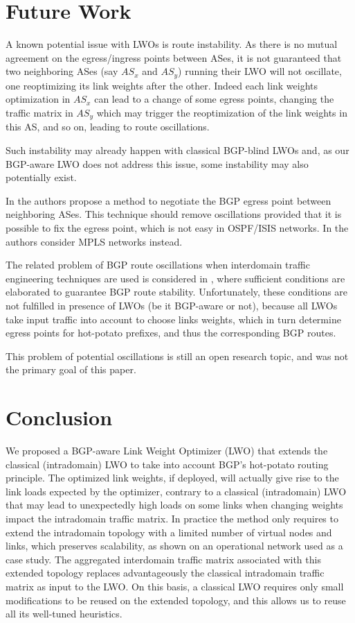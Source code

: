 \documentclass{acm_proc_article-sp}
\begin{document}
\section{Future Work}
\label{sec:extensions}

A known potential issue with LWOs is route instability. As there is no mutual agreement
on the egress/ingress points between ASes, it is not guaranteed that
two neighboring ASes (say $AS_x$ and $AS_y$) running their LWO will not oscillate,
one reoptimizing its link weights after the other. Indeed each link weights
optimization in $AS_x$ can lead to a change of some egress points, changing
the traffic matrix in $AS_y$ which may trigger the reoptimization of
the link weights in this AS, and so on, leading to route oscillations.

Such instability may already happen with classical BGP-blind LWOs and, as our BGP-aware
LWO does not address this issue, some instability may also potentially exist.

In \cite{mahajan2005} the authors propose a method to negotiate
the BGP egress point between neighboring ASes. This technique should
remove oscillations provided that it is possible to fix the egress point,
which is not easy in OSPF/ISIS networks. In \cite{mahajan2005} the
authors consider MPLS networks instead.

The related problem of BGP route oscillations when interdomain traffic
engineering techniques are used is considered in
\cite{yang05}, where sufficient conditions are elaborated to guarantee BGP route stability.
Unfortunately, these conditions are not fulfilled in presence of LWOs (be it BGP-aware or not),
because all LWOs take input traffic into account to choose links weights, which in turn
determine egress points for hot-potato prefixes, and thus the corresponding BGP routes.

This problem of potential oscillations is still an open research
topic, and was not the primary goal of this paper.



\section{Conclusion}
\label{sec:conclusion}

We proposed a BGP-aware Link Weight Optimizer (LWO) 
that extends the 
classical (intradomain) LWO to take into account BGP's hot-potato routing principle. 
The optimized link weights, if deployed, will actually give rise to the 
link loads expected by the optimizer, contrary to a classical (intradomain) 
LWO that may lead to unexpectedly high loads on some links when changing 
weights impact the intradomain traffic matrix.
In practice the method only requires to extend the intradomain topology 
with a limited number of virtual nodes and links, which preserves scalability, 
as shown on an operational network used as a case study. The aggregated interdomain
traffic matrix associated with this extended topology 
replaces advantageously the classical intradomain traffic matrix as input to the
LWO.
On this basis, a classical LWO requires only small modifications to be reused on the extended topology, 
and this allows us to reuse all its well-tuned heuristics.
\end{document}
